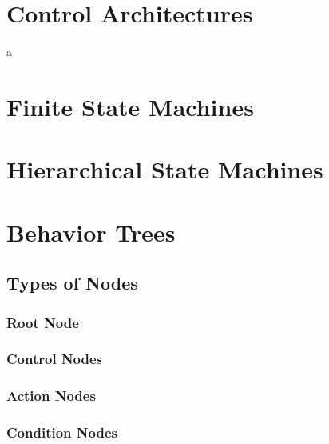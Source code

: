 \section{Control Architectures}

a

\section{Finite State Machines}

\section{Hierarchical State Machines}

\section{Behavior Trees}




\subsection{Types of Nodes}

\subsubsection{Root Node} 

\subsubsection{Control Nodes} 
\label{subsubsec:control_nodes}

\subsubsection{Action Nodes}

\subsubsection{Condition Nodes}

